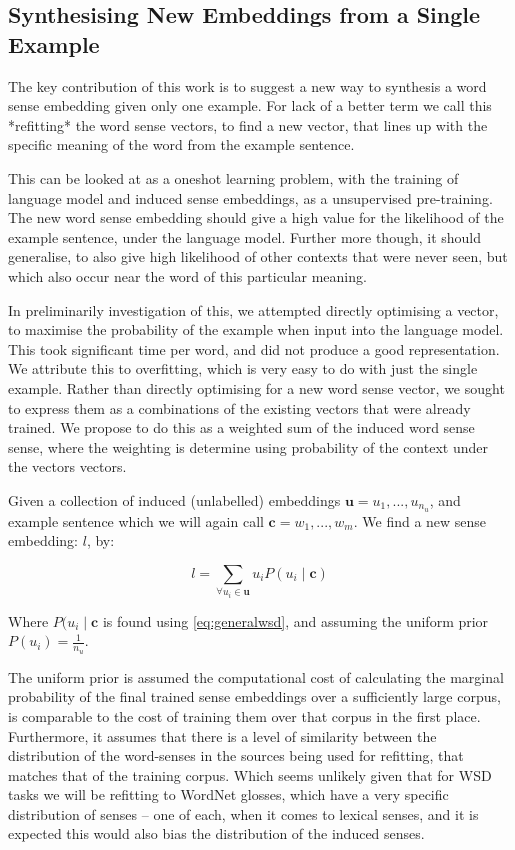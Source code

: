 \documentclass{sig-alternate}
\renewcommand{\c}{\mathbf{c}}
\renewcommand{\u}{\mathbf{u}}
\begin{document}
\subsection{Synthesising New Embeddings from a Single Example}

The key contribution of this work is to suggest a new way to synthesis a word sense embedding given only one example. For lack of a better term we call this *refitting* the word sense vectors, to find a new vector, that lines up with the specific meaning of the word from the example sentence.

This can be looked at as a oneshot learning problem, with the training of language model and induced sense embeddings, as a unsupervised pre-training. The new word sense embedding should give a high value for the likelihood of the example sentence, under the language model. Further more though, it should generalise, to also give high likelihood of other contexts that were never seen, but which also occur near the word of this particular meaning.

In preliminarily investigation of this, we attempted directly optimising a vector, to maximise the probability of the example when input into the language model. This took significant time per word, and did not produce a good representation. We attribute this to overfitting, which is very easy to do with just the single example. Rather than directly optimising for a new word sense vector, we sought to express them as a combinations of the existing vectors that were already trained. We propose to do this as a weighted sum of the induced word sense sense, where the weighting is determine using  probability of the context under the vectors vectors.


Given a collection of induced (unlabelled) embeddings $\u={u_1,...,u_{n_u}}$, and example sentence which we will again call $\c={w_1,...,w_m}$. We find a new sense embedding: $l$, by: 

\begin{equation} \label{eq:synth}
l=\sum_{\forall u_i \in \u} u_iP(u_i \mid \c)
\end{equation}

Where $P(u_i \mid \c$ is found using \cref{eq:generalwsd}, and assuming the uniform prior $P(u_i)=\frac{1}{n_u}$.

The uniform prior is assumed the computational cost of calculating the marginal probability of the final trained sense embeddings over a sufficiently large corpus, is comparable to the cost of training them over that corpus in the first place. Furthermore, it assumes that there is a level of similarity between the distribution of the word-senses in the sources being used for refitting, that matches that of the training corpus. Which seems unlikely given that for WSD tasks we will be refitting to WordNet glosses, which have a very specific distribution of senses -- one of each, when it comes to lexical senses, and it is expected this would also bias the distribution of the induced senses.
\end{document}
